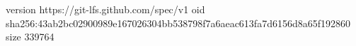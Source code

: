 version https://git-lfs.github.com/spec/v1
oid sha256:43ab2bc02900989e167026304bb538798f7a6aeac613fa7d6156d8a65f192860
size 339764
